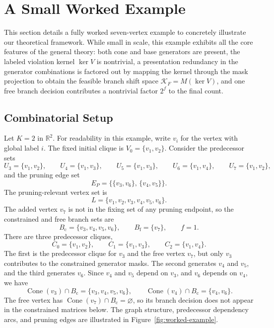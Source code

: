 \section{A Small Worked Example}
\label{sec:example}

This section details a fully worked seven-vertex example to concretely illustrate our theoretical framework. While small in scale, this example exhibits all the core features of the general theory: both cone and base generators are present, the labeled violation kernel $\ker V$ is nontrivial, a presentation redundancy in the generator combinations is factored out by mapping the kernel through the mask projection to obtain the feasible branch shift space $\mathcal{K}_F = M(\ker V)$, and one free branch decision contributes a nontrivial factor $2^f$ to the final count.

\subsection{Combinatorial Setup}
\label{sec:example-combo}

Let $K=2$ in $\mathbb{R}^2$. For readability in this example, write $v_i$ for the vertex with global label $i$. The fixed initial clique is $V_0=\{v_1, v_2\}$. Consider the predecessor sets
\[
U_3=\{v_1, v_2\},
\qquad
U_4=\{v_1, v_3\},
\qquad
U_5=\{v_1, v_3\},
\qquad
U_6=\{v_1, v_4\},
\qquad
U_7=\{v_1, v_2\},
\]
and the pruning edge set
\[
E_P=\{\{v_3, v_6\},\,\{v_4, v_5\}\}.
\]
The pruning-relevant vertex set is
\[
L=\{v_1,v_2,v_3,v_4,v_5,v_6\}.
\]
The added vertex $v_7$ is not in the fixing set of any pruning endpoint, so the constrained and free branch sets are
\[
B_{\mathrm{c}}=\{v_3, v_4, v_5, v_6\},
\qquad
B_{\mathrm{f}}=\{v_7\},
\qquad
f=1.
\]
There are three predecessor cliques,
\[
C_0=\{v_1, v_2\},
\qquad
C_1=\{v_1, v_3\},
\qquad
C_2=\{v_1, v_4\}.
\]
The first is the predecessor clique for $v_3$ and the free vertex $v_7$, but only $v_3$ contributes to the constrained generator masks. The second generates $v_4$ and $v_5$, and the third generates $v_6$. Since $v_4$ and $v_5$ depend on $v_3$, and $v_6$ depends on $v_4$, we have
\[
\operatorname{Cone}(v_3)\cap B_{\mathrm{c}}=\{v_3,v_4,v_5,v_6\},
\qquad
\operatorname{Cone}(v_4)\cap B_{\mathrm{c}}=\{v_4, v_6\}.
\]
The free vertex has $\operatorname{Cone}(v_7)\cap B_{\mathrm{c}}=\varnothing$, so its branch decision does not appear in the constrained matrices below.
The graph structure, predecessor dependency arcs, and pruning edges are illustrated in Figure~\ref{fig:worked-example}.

